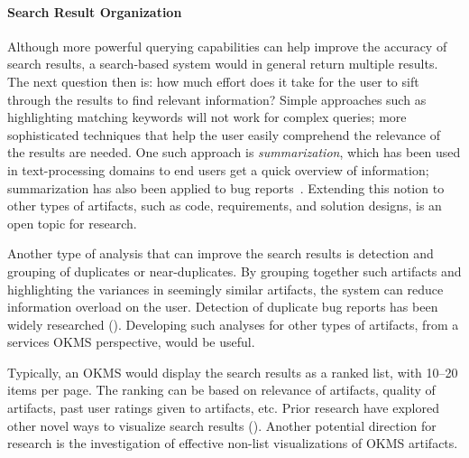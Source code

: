 \paragraph*{Search Result Organization}
Although more powerful querying capabilities can help improve the accuracy of
search results, a search-based system would in general return multiple
results. The next question then is: how much effort does it take for the user to
sift through the results to find relevant information? Simple approaches such as
highlighting matching keywords will not work for complex queries; more
sophisticated techniques that help the user easily comprehend the relevance of
the results are needed. One such approach is \textit{summarization}, which has
been used in text-processing domains to end users get a quick overview of
information; summarization has also been applied to bug
reports~\cite{Mani:2012,Rastkar:2010}. Extending this notion to other types of
artifacts, such as code, requirements, and solution designs, is an open topic
for research.

Another type of analysis that can improve the search results is detection and
grouping of duplicates or near-duplicates. By grouping together such artifacts
and highlighting the variances in seemingly similar artifacts, the system can
reduce information overload on the user.  Detection of duplicate bug reports has
been widely researched
(\eg \cite{wang2008approach,sun2010discriminative}). Developing such analyses
for other types of artifacts, from a services OKMS perspective, would be useful.

Typically, an OKMS would display the search results as a ranked list, with
10--20 items per page. The ranking can be based on relevance of artifacts,
quality of artifacts, past user ratings given to artifacts, etc. Prior research
have explored other novel ways to visualize search results
(\eg \cite{Nowell:1996,Shneiderman:2000}).  Another potential direction for
research is the investigation of effective non-list visualizations of OKMS
artifacts.


